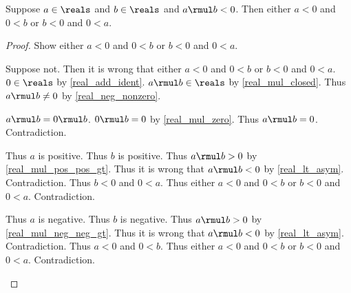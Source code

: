 \begin{theorem}\label{real_mul_neg_opposite_sign_rev}
    Suppose $a\in\reals$ and $b\in\reals$ and $a \rmul b < 0$.
    Then either $a < 0$ and $0 < b$ or $b < 0$ and $0 < a$.
\end{theorem}
\begin{proof}
    Show either $a < 0$ and $0 < b$ or $b < 0$ and $0 < a$.
    \begin{subproof}
        Suppose not.
        Then it is wrong that either $a < 0$ and $0 < b$ or $b < 0$ and $0 < a$.
        $0\in\reals$ by \cref{real_add_ident}.
        $a \rmul b\in\reals$ by \cref{real_mul_closed}.
        Thus $a \rmul b \neq 0$ by \cref{real_neg_nonzero}.
        \begin{byCase}
            $a \rmul b = 0 \rmul b$.
            $0 \rmul b = 0$ by \cref{real_mul_zero}.
            Thus $a \rmul b = 0$.
            Contradiction.
            \begin{byCase}
                Thus $a$ is positive.
                Thus $b$ is positive.
                Thus $a \rmul b > 0$ by \cref{real_mul_pos_pos_gt}.
                Thus it is wrong that $a \rmul b < 0$ by \cref{real_lt_asym}.
                Contradiction.
                Thus $b < 0$ and $0 < a$.
                Thus either $a < 0$ and $0 < b$ or $b < 0$ and $0 < a$.
                Contradiction.
            \end{byCase}
            \begin{byCase}
                Thus $a$ is negative.
                Thus $b$ is negative.
                Thus $a \rmul b > 0$ by \cref{real_mul_neg_neg_gt}.
                Thus it is wrong that $a \rmul b < 0$ by \cref{real_lt_asym}.
                Contradiction.
                Thus $a < 0$ and $0 < b$.
                Thus either $a < 0$ and $0 < b$ or $b < 0$ and $0 < a$.
                Contradiction.
            \end{byCase}
        \end{byCase}
    \end{subproof}
\end{proof}

